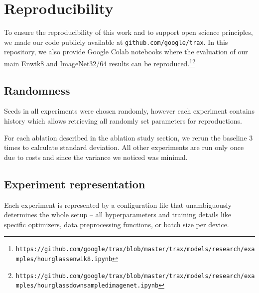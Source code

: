 \documentclass[11pt]{article}
\begin{document}
\section{Reproducibility}
To ensure the reproducibility of this work and to support open science principles, we made our code publicly available at \texttt{github.com/google/trax}. In this repository, we also provide Google Colab notebooks where the evaluation of our main \href{https://colab.research.google.com/github/google/trax/blob/master/trax/models/research/examples/hourglass_enwik8.ipynb}{Enwik8} and \href{https://colab.research.google.com/github/google/trax/blob/master/trax/models/research/examples/hourglass_downsampled_imagenet.ipynb}{ImageNet32/64} results can be reproduced.\footnote{\texttt{https://github.com/google/trax/blob/master/trax/models/research/examples/hourglass\textunderscore enwik8.ipynb}}\footnote{\texttt{https://github.com/google/trax/blob/master/trax/models/research/examples/hourglass\textunderscore downsampled\textunderscore imagenet.ipynb}} 

\subsection{Randomness}
Seeds in all experiments were chosen randomly, however each experiment contains history which allows retrieving all randomly set parameters for reproductions. 

For each ablation described in the ablation study section, we rerun the baseline $3$ times to calculate standard deviation. All other experiments are run only once due to costs and since the variance we noticed was minimal.

\subsection{Experiment representation}
Each experiment is represented by a configuration file that unambiguously determines the whole setup -- all hyperparameters and training details like specific optimizers, data preprocessing functions, or batch size per device.
\end{document}
